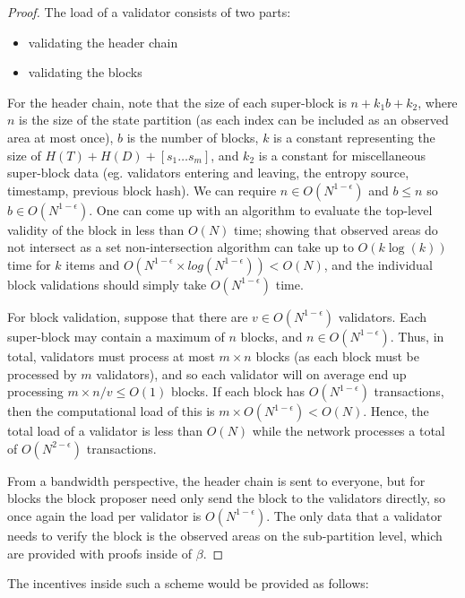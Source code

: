 \documentclass[11pt,a4paper]{report}
\theoremstyle{plain}
\theoremstyle{definition}
\theoremstyle{remark}
\begin{document}
\begin{proof}
The load of a validator consists of two parts:

\begin{itemize}
\item
validating the header chain
\item
validating the blocks
\end{itemize}

For the header chain, note that the size of each super-block is $n+k_1b+k_2$, where $n$ is the size of the state partition (as each index can be included as an observed area at most once), $b$ is the number of blocks, $k$ is a constant representing the size of $H(T) + H(D) + [s_1 \ldots s_m]$, and $k_2$ is a constant for miscellaneous super-block data (eg. validators entering and leaving, the entropy source, timestamp, previous block hash). We can require $n \in O(N^{1-\epsilon})$ and $b \le n$ so $b \in O(N^{1-\epsilon})$. One can come up with an algorithm to evaluate the top-level validity of the block in less than $O(N)$ time; showing that observed areas do not intersect as a set non-intersection algorithm can take up to $O(k\log(k))$ time for $k$ items and $O(N^{1-\epsilon} \times  log(N^{1-\epsilon})) < O(N)$, and the individual block validations should simply take $O(N^{1-\epsilon})$ time.

For block validation, suppose that there are $v \in O(N^{1-\epsilon})$ validators. Each super-block may contain a maximum of $n$ blocks, and $n \in O(N^{1-\epsilon})$. Thus, in total, validators must process at most $m\times  n$ blocks (as each block must be processed by $m$ validators), and so each validator will on average end up processing $m\times n/v \le O(1)$ blocks. If each block has $O(N^{1-\epsilon})$ transactions, then the computational load of this is $m \times  O(N^{1-\epsilon}) < O(N)$. Hence, the total load of a validator is less than $O(N)$ while the network processes a total of $O(N^{2-\epsilon})$ transactions.

From a bandwidth perspective, the header chain is sent to everyone, but for blocks the block proposer need only send the block to the validators directly, so once again the load per validator is $O(N^{1-\epsilon})$. The only data that a validator needs to verify the block is the observed areas on the sub-partition level, which are provided with proofs inside of $\beta$.
\end{proof}

The incentives inside such a scheme would be provided as follows:
\end{document}

